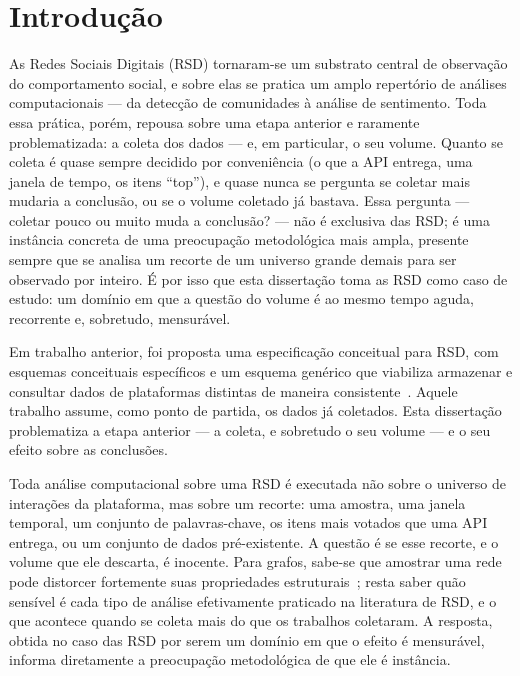 
\chapter{Introdução}
\label{cap:intro}

As Redes Sociais Digitais (RSD) tornaram-se um substrato central de observação
do comportamento social, e sobre elas se pratica um amplo repertório de análises
computacionais --- da detecção de comunidades à análise de sentimento. Toda essa
prática, porém, repousa sobre uma etapa anterior e raramente problematizada: a
coleta dos dados ---  e, em particular, o seu volume. Quanto se
coleta é quase sempre decidido por conveniência (o que a API entrega, uma janela
de tempo, os itens ``top''), e quase nunca se pergunta se coletar mais
mudaria a conclusão, ou se o volume coletado já bastava. Essa pergunta ---
coletar pouco ou muito muda a conclusão? --- não é exclusiva das RSD; é
uma instância concreta de uma preocupação metodológica mais ampla, presente
sempre que se analisa um recorte de um universo grande demais para ser
observado por inteiro. É por isso que esta dissertação toma as RSD como
caso de estudo: um domínio em que a questão do volume é ao mesmo tempo
aguda, recorrente e, sobretudo, mensurável.

Em trabalho anterior, foi proposta uma especificação conceitual para RSD, com
esquemas conceituais específicos e um esquema genérico que viabiliza armazenar e
consultar dados de plataformas distintas de maneira
consistente~\cite{salgueiro2023,salgueiro2022dbmodels}. Aquele trabalho assume,
como ponto de partida, os dados já coletados. Esta dissertação
problematiza a etapa anterior --- a coleta, e sobretudo o seu volume ---
e o seu efeito sobre as conclusões.

Toda análise computacional sobre uma RSD é executada não sobre o universo de
interações da plataforma, mas sobre um recorte: uma amostra, uma janela
temporal, um conjunto de palavras-chave, os itens mais votados que uma API entrega,
ou um conjunto de dados pré-existente. A questão é se esse recorte, e o volume que
ele descarta, é inocente. Para grafos, sabe-se que amostrar uma rede pode
distorcer fortemente suas propriedades estruturais~\cite{leskovec2006sampling};
resta saber quão sensível é cada tipo de análise efetivamente praticado na
literatura de RSD, e o que acontece quando se coleta mais do que os
trabalhos coletaram. A resposta, obtida no caso das RSD por serem um domínio em
que o efeito é mensurável, informa diretamente a preocupação metodológica de que
ele é instância.

